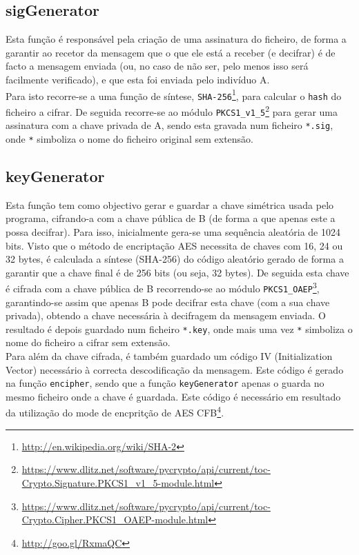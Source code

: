 \documentclass[a4paper,11pt,openright,oneside]{report}
\begin{document}
\subsection{sigGenerator}

Esta função é responsável pela criação de uma assinatura do ficheiro, de forma a garantir ao recetor da mensagem que o que ele está a receber (e decifrar) é de facto a mensagem enviada (ou, no caso de não ser, pelo menos isso será facilmente verificado), e que esta foi enviada pelo indivíduo A.\\
Para isto recorre-se a uma função de síntese, \verb|SHA-256|\footnote{\url{http://en.wikipedia.org/wiki/SHA-2}}, para calcular o \verb|hash| do ficheiro a cifrar. De seguida recorre-se ao módulo \verb|PKCS1_v1_5|\footnote{\url{https://www.dlitz.net/software/pycrypto/api/current/toc-Crypto.Signature.PKCS1_v1_5-module.html}} para gerar uma assinatura com a chave privada de A, sendo esta gravada num ficheiro \verb|*.sig|, onde \verb|*| simboliza o nome do ficheiro original sem extensão.

\subsection{keyGenerator}

Esta função tem como objectivo gerar e guardar a chave simétrica usada pelo programa, cifrando-a com a chave pública de B (de forma a que apenas este a possa decifrar). Para isso, inicialmente gera-se uma sequência aleatória de 1024 bits. Visto que o método de encriptação AES necessita de chaves com 16, 24 ou 32 bytes, é calculada a síntese (SHA-256) do código aleatório gerado de forma a garantir que a chave final é de 256 bits (ou seja, 32 bytes). De seguida esta chave é cifrada com a chave pública de B recorrendo-se ao módulo \verb|PKCS1_OAEP|\footnote{\url{https://www.dlitz.net/software/pycrypto/api/current/toc-Crypto.Cipher.PKCS1_OAEP-module.html}}, garantindo-se assim que apenas B pode decifrar esta chave (com a sua chave privada), obtendo a chave necessária à decifragem da mensagem enviada. O resultado é depois guardado num ficheiro \verb|*.key|, onde mais uma vez \verb|*| simboliza o nome do ficheiro a cifrar sem extensão.\\
Para além da chave cifrada, é também guardado um código IV (Initialization Vector) necessário à correcta descodificação da mensagem. Este código é gerado na função \verb|encipher|, sendo que a função \verb|keyGenerator| apenas o guarda no mesmo ficheiro onde a chave é guardada. Este código é necessário em resultado da utilização do mode de encpritção de AES CFB\footnote{\url{http://goo.gl/RxmaQC}}.
\end{document}
